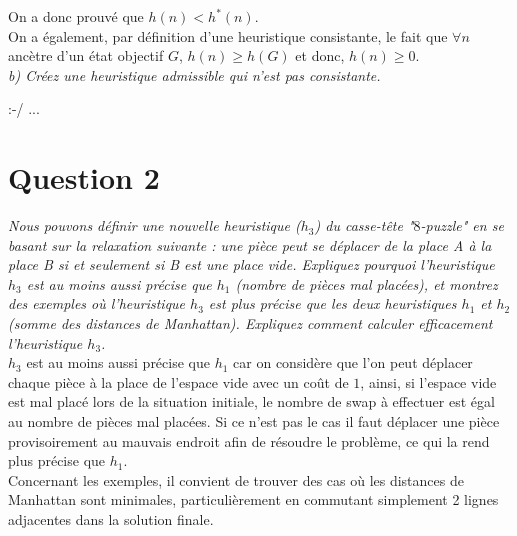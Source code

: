 \documentclass{article}
\newcommand{\term}[1]{\textit{\textcolor{maintitle}{#1}}}
\begin{document}
\begin{sffamily}
On a donc prouvé que $h(n) < h^*(n)$.\\

On a également, par définition d'une heuristique consistante, le fait que $\forall n$ ancètre d'un état objectif $G$, $h(n)\geq 
h(G)$ et donc, $h(n)\geq 0$. \\

\noindent \term{b) Créez une heuristique admissible qui n’est pas consistante.}


:-/ ...

\section{Question 2}

\term{Nous pouvons définir une nouvelle heuristique ($h_3$) du casse-tête "$8$-puzzle" en se basant sur la relaxation suivante : 
une pièce peut se déplacer de la place A à la place B si et seulement si B est une place vide. Expliquez pourquoi l’heuristique 
$h_3$ est au moins aussi précise que $h_1$ (nombre de pièces mal placées), et montrez des exemples où l’heuristique $h_3$ est 
plus précise que les deux heuristiques $h_1$ et $h_2$ (somme des distances de Manhattan). Expliquez comment calculer efficacement 
l’heuristique $h_3$.} \\

$h_3$ est au moins aussi précise que $h_1$ car on considère que l'on peut déplacer chaque pièce à la place de l'espace vide avec 
un coût de $1$, ainsi, si l'espace vide est mal placé lors de la situation initiale, le nombre de swap à effectuer est égal au 
nombre de pièces mal placées. Si ce n'est pas le cas il faut déplacer une pièce provisoirement au mauvais endroit afin de 
résoudre le problème, ce qui la rend plus précise que $h_1$. \\

Concernant les exemples, il convient de trouver des cas où les distances de Manhattan sont minimales, particulièrement en 
commutant simplement 2 lignes adjacentes dans la solution finale.


\end{sffamily}
\end{document}
